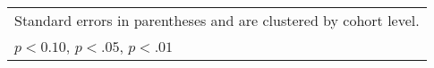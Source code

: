 \begin{table}[htbp]
\begin{adjustbox}{max width=0.4\textwidth}
\begin{tabular}{l*{2}{c}}
\hline\hline
\multicolumn{3}{l}{\footnotesize Standard errors in parentheses and are clustered by cohort level.}\\
\multicolumn{3}{l}{\footnotesize \sym{*} \(p<0.10\), \sym{**} \(p<.05\), \sym{***} \(p<.01\)}\\
\end{tabular}%
	\end{adjustbox}
\end{table}